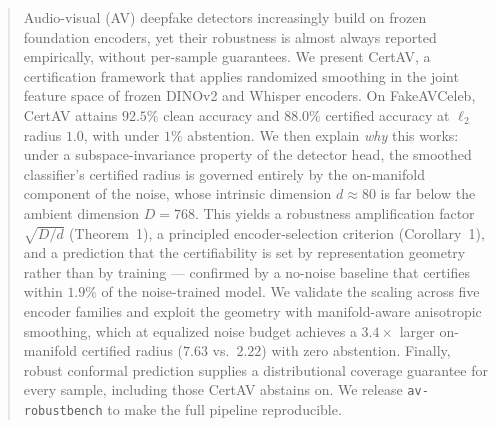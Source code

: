 \begin{abstract}
Audio-visual (AV) deepfake detectors increasingly build on frozen foundation encoders, yet their robustness is almost always reported empirically, without per-sample guarantees. We present CertAV, a certification framework that applies randomized smoothing in the joint feature space of frozen DINOv2 and Whisper encoders. On FakeAVCeleb, CertAV attains $92.5\%$ clean accuracy and $88.0\%$ certified accuracy at $\ell_2$ radius $1.0$, with under $1\%$ abstention. We then explain \emph{why} this works: under a subspace-invariance property of the detector head, the smoothed classifier's certified radius is governed entirely by the on-manifold component of the noise, whose intrinsic dimension $d\!\approx\!80$ is far below the ambient dimension $D\!=\!768$. This yields a robustness amplification factor $\sqrt{D/d}$ (Theorem~1), a principled encoder-selection criterion (Corollary~1), and a prediction that the certifiability is set by representation geometry rather than by training --- confirmed by a no-noise baseline that certifies within $1.9\%$ of the noise-trained model. We validate the scaling across five encoder families and exploit the geometry with manifold-aware anisotropic smoothing, which at equalized noise budget achieves a $3.4\times$ larger on-manifold certified radius ($7.63$ vs.\ $2.22$) with zero abstention. Finally, robust conformal prediction supplies a distributional coverage guarantee for every sample, including those CertAV abstains on. We release \texttt{av-robustbench} to make the full pipeline reproducible.
\end{abstract}
